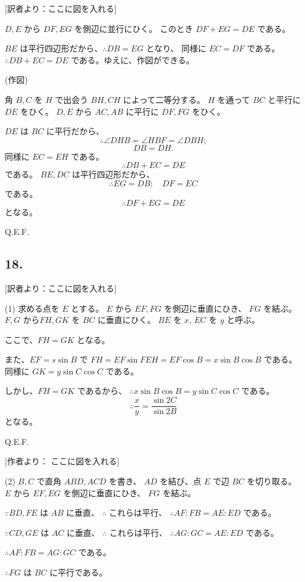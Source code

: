 [訳者より：ここに図を入れる]

$D, E$ から $DF, EG$ を側辺に並行にひく。
このとき $DF + EG = DE$ である。

$BE$ は平行四辺形だから、$\therefore DB = EG$ となり、
同様に $EC = DF$ である。
$\therefore DB + EC = DE$ である。ゆえに、作図ができる。

(作図)

角 $B, C$ を $H$ で出会う $BH, CH$ によって二等分する。
$H$ を通って $BC$ と平行に $DE$ をひく。
$D, E$ から $AC, AB$ に平行に $DF, FG$ をひく。

$DE$ は $BC$ に平行だから、
\[
\therefore \angle DHB = \angle HBF = \angle DBH;
\]
\[
DB = DH.
\]
同様に $EC = EH$ である。
\[
\therefore
DB + EC = DE
\]
である。
$BE, DC$ は平行四辺形だから、
\[
\therefore
EG = DB; \quad DF = EC
\]
である。
\[
\therefore
DF + EG = DE
\]
となる。

Q.E.F.

\subsection*{18.}

[訳者より：ここに図を入れる]

(1)
求める点を $E$ とする。
$E$ から $EF, FG$ を側辺に垂直にひき、
$FG$ を結ぶ。
$F, G$ から$FH, GK$ を $BC$ に垂直にひく。
$BE$ を $x$, $EC$ を $y$ と呼ぶ。

ここで、$FH = GK$ となる。

また、$EF = s \sin B$ で $FH = EF \sin FEH = EF \cos B = x \sin B \cos B$
である。
同様に $GK = y \sin C \cos C$ である。

しかし、$FH = GK$ であるから、
$\therefore x \sin B \cos B = y \sin C \cos C$
である。
\[
\therefore
\frac{x}{y} = \frac{\sin 2C}{\sin 2B}
\]
となる。

Q.E.F.

[作者より： ここに図を入れる]

(2)
$B, C$ で直角 $ABD, ACD$ を書き、
$AD$ を結び、点 $E$ で辺 $BC$ を切り取る。
$E$ から $EF, EG$ を側辺に垂直にひき、
$FG$ を結ぶ。

$\because BD, FE$ は $AB$ に垂直、
$\therefore$ これらは平行、
$\therefore AF: FB = AE: ED$ である。

$\because CD, GE$ は $AC$ に垂直、
$\therefore$ これらは平行、
$\therefore AG: GC = AE: ED$ である。

$\therefore
AF: FB = AG: GC$ である。

$\therefore FG$ は $BC$ に平行である。

